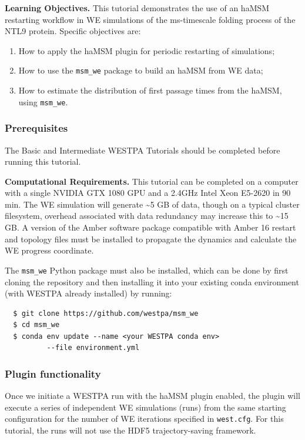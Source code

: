 \textbf{Learning Objectives.}  This tutorial demonstrates the use of an haMSM restarting workflow in WE simulations of the ms-timescale folding process of the NTL9 protein. 
Specific objectives are:
\begin{enumerate}
    \item How to apply the haMSM plugin for periodic restarting of simulations;
    \item How to use the \verb|msm_we| package to build an haMSM from WE data;
    \item How to estimate the distribution of first passage times from the haMSM, using \verb|msm_we|.
\end{enumerate}

\subsubsection{Prerequisites} The Basic and Intermediate WESTPA Tutorials \citep{bogetti_suite_2019} should be completed before running this tutorial.

\textbf{Computational Requirements.} This tutorial can be completed on a computer with a single NVIDIA GTX 1080 GPU and a 2.4GHz Intel Xeon E5-2620 in 90 min. 
The WE simulation will generate \textasciitilde5 GB of data, though on a typical cluster filesystem, overhead associated with data redundancy may increase this to \textasciitilde15 GB. 
A version of the Amber software package compatible with Amber 16 restart and topology files must be installed to propagate the dynamics and calculate the WE progress coordinate. 

The \verb|msm_we| Python package must also be installed, which can be done by first cloning the repository and then installing it into your existing conda environment (with WESTPA already installed) by running:
\begin{verbatim}
  $ git clone https://github.com/westpa/msm_we
  $ cd msm_we 
  $ conda env update --name <your WESTPA conda env> 
          --file environment.yml
\end{verbatim}

\subsubsection{Plugin functionality}
Once we initiate a WESTPA run with the haMSM plugin enabled, the plugin will execute a series of independent WE simulations (runs) from the same starting configuration for the number of WE iterations specified in \verb|west.cfg|. 
For this tutorial, the runs will not use the HDF5 trajectory-saving framework.


